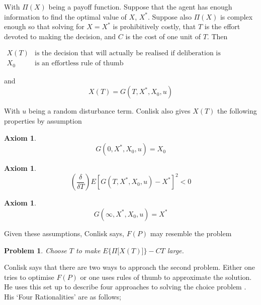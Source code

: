 \documentclass{ucthesis}
\newtheorem{axiom}[theorem]{Axiom}
\newtheorem{problem}[theorem]{Problem}
\begin{document}
With $\Pi \left( X\right) $ being a payoff function. Suppose that the agent
has enough information to find the optimal value of $X$, $X^{\ast }$.
Suppose also $\Pi \left( X\right) $ is complex enough so that solving for $%
X=X^{\ast }$ is prohibitively costly, that $T$ is the effort devoted to
making the decision, and $C$ is the cost of one unit of $T$. Then

$%
\begin{array}{ll}
X\left( T\right) & \text{is the decision that will actually be realised if
deliberation is undertaken} \\ 
X_{0} & \text{is an effortless rule of thumb}%
\end{array}%
$

and%
\begin{equation}
X\left( T\right) =G\left( T,X^{\ast },X_{0},u\right)
\end{equation}

With $u$ being a random disturbance term. Conlisk also gives $X\left(
T\right) $ the following properties by assumption

\begin{axiom}
\begin{equation}
G\left( 0,X^{\ast },X_{0},u\right) =X_{0}
\end{equation}
\end{axiom}

\begin{axiom}
\begin{equation}
\left( \dfrac{\delta }{\delta T}\right) E[G\left( T,X^{\ast },X_{0},u\right)
-X^{\ast }]^{2}<0
\end{equation}
\end{axiom}

\begin{axiom}
\begin{equation}
G\left( \infty ,X^{\ast },X_{0},u\right) =X^{\ast }
\end{equation}
\end{axiom}

Given these assumptions, Conlisk says, $F\left( P\right) $ may resemble the
problem

\begin{problem}
Choose $T$ to make $E\{\Pi \lbrack X(T)]\}-CT$ large.
\end{problem}

Conlisk says that there are two ways to approach the second problem. Either
one tries to optimise $F\left( P\right) $ or one uses rules of thumb to
approximate the solution. He uses this set up to describe four approaches to
solving the choice problem \cite[pp. 689]{conlisk}. His `Four Rationalities'
are as follows;
\end{document}
